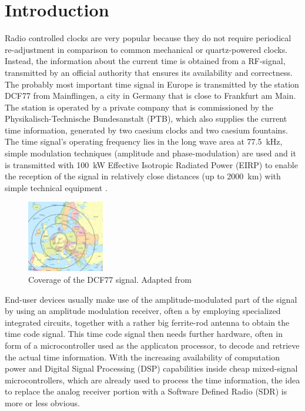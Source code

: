 \documentclass[conference]{IEEEtran}
\begin{document}
\section{Introduction}
Radio controlled clocks are very popular because they do not require periodical re-adjustment in comparison to common mechanical or quartz-powered clocks.
Instead, the information about the current time is obtained from a RF-signal, transmitted by an official authority that ensures its availability and correctness.
The probably most important time signal in Europe is transmitted by the station DCF77 from Mainflingen, a city in Germany that is close to Frankfurt am Main.
The station is operated by a private company that is commissioned by the Physikalisch-Technische Bundesanstalt (PTB), which also supplies the current time information,
generated by two caesium clocks and two caesium fountains.
The time signal's operating frequency lies in the long wave area at \SI{77.5}{\kilo\hertz}, simple modulation techniques (amplitude and phase-modulation) are used and it is transmitted with \SI{100}{\kilo\watt} Effective Isotropic Radiated Power (EIRP) to enable the reception of the
signal in relatively close distances (up to \SI{2000}{\kilo\meter}) with simple technical equipment \cite{b2}.
\begin{figure}[!htbp]
    \centerline{\includegraphics[width=0.3\textwidth]{img/dcf77_range.jpg}}
    \caption{Coverage of the DCF77 signal. Adapted from \cite{b1}}
    \label{fig:dcf77_range}
\end{figure}
\FloatBarrier
End-user devices usually make use of the amplitude-modulated part of the signal by using an amplitude modulation receiver, often a by employing specialized integrated circuits,
together with a rather big ferrite-rod antenna to obtain the time code signal.
This time code signal then needs further hardware, often in form of a microcontroller used as the applicaton processor, to decode and retrieve the actual time information.
With the increasing availability of computation power and Digital Signal Processing (DSP) capabilities inside cheap mixed-signal microcontrollers, which are already used
to process the time information, the idea to replace the analog receiver portion with a Software Defined Radio (SDR) is more or less obvious.
\end{document}
